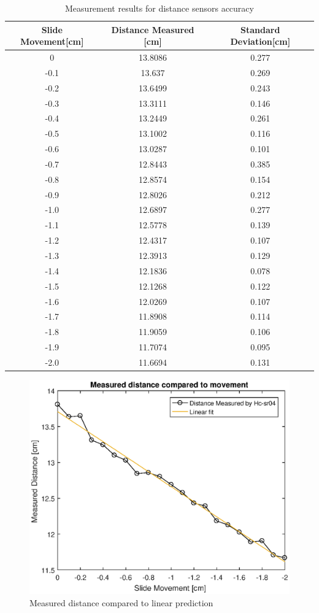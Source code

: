 \documentclass[twoside]{ctuthesis}
\theoremstyle{plain}
\theoremstyle{definition}
\theoremstyle{note}
\begin{document}
\begin{table}[H]
\centering
	\begin{tabular}{| c |c| c |}
		\hline
		Slide Movement[cm] & Distance Measured [cm] & Standard Deviation[cm]\\ \hline
		0 & 13.8086 & 0.277\\
		-0.1 & 13.637 & 0.269\\
		-0.2 & 13.6499 & 0.243\\
		-0.3 & 13.3111 & 0.146\\
		-0.4 & 13.2449 & 0.261\\
		-0.5 & 13.1002 & 0.116\\
		-0.6 & 13.0287 & 0.101\\
		-0.7 & 12.8443 & 0.385\\
		-0.8 & 12.8574 & 0.154\\
		-0.9 & 12.8026 & 0.212\\
		-1.0 & 12.6897 & 0.277\\
		-1.1 & 12.5778 & 0.139\\
		-1.2 & 12.4317 & 0.107\\
		-1.3 & 12.3913 & 0.129\\
		-1.4 & 12.1836 & 0.078\\
		-1.5 & 12.1268 & 0.122\\
		-1.6 & 12.0269 & 0.107\\
		-1.7 & 11.8908 & 0.114\\
		-1.8 & 11.9059 & 0.106\\
		-1.9 & 11.7074 & 0.095\\
		-2.0 & 11.6694 & 0.131\\
		\hline
	\end{tabular}
	\caption{Measurement results for distance sensors accuracy}
\end{table}



\begin{figure}[H]
	\centering
	\includegraphics[width = \textwidth]{DistanceMeasuringGraphAndFit2}
	\caption{Measured distance compared to linear prediction}
\end{figure}
\end{document}
